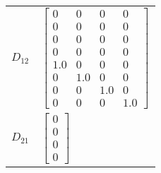 \begin{tabular}{cl}
 $D_{12}$ & $\left[\begin{matrix}0 & 0 & 0 & 0\\0 & 0 & 0 & 0\\0 & 0 & 0 & 0\\0 & 0 & 0 & 0\\1.0 & 0 & 0 & 0\\0 & 1.0 & 0 & 0\\0 & 0 & 1.0 & 0\\0 & 0 & 0 & 1.0\end{matrix}\right]$                                                                                                                                                                                                                                                                                                              \\
 $D_{21}$ & $\left[\begin{matrix}0\\0\\0\\0\end{matrix}\right]$                                                                                                                                                                                                                                                                                                                                                                                                                                  \\
\hline
\end{tabular}